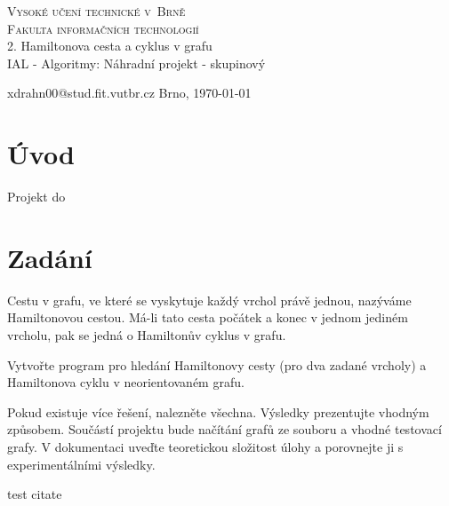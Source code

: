 \documentclass[a4paper,11pt]{article}
\begin{document}
\begin{titlepage}

	\begin{center}
		{\Huge\textsc{Vysoké učení technické v~Brně}}\\
		\medskip
		{\huge\textsc{Fakulta informačních technologií}}\\
		{\huge 2. Hamiltonova cesta a cyklus v grafu}\\
		\medskip
		{\LARGE IAL - Algoritmy: Náhradní projekt - skupinový}\\
	\end{center}

    \noindent xdrahn00@stud.fit.vutbr.cz \Large {\hfill Brno, \today}

\end{titlepage}

\section{Úvod}

Projekt do

\section{Zadání}

Cestu v grafu, ve které se vyskytuje každý vrchol právě jednou, nazýváme Hamiltonovou cestou. Má-li tato cesta počátek a konec v jednom jediném vrcholu, pak se jedná o Hamiltonův cyklus v grafu. 

Vytvořte program pro hledání Hamiltonovy cesty (pro dva zadané vrcholy) a Hamiltonova cyklu v neorientovaném grafu. 

Pokud existuje více řešení, nalezněte všechna. Výsledky prezentujte vhodným způsobem. Součástí projektu bude načítání grafů ze souboru a vhodné testovací grafy. V dokumentaci uveďte teoretickou složitost úlohy a porovnejte ji s experimentálními výsledky.

test citate \cite{test_citate}

\end{document}
